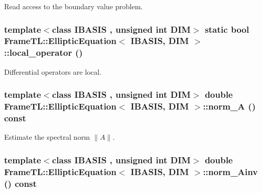 Read access to the boundary value problem. \hypertarget{classFrameTL_1_1EllipticEquation_ca8c08093d2faeac98f8cfae67468f36}{
\subsubsection[{local\_\-operator}]{\setlength{\rightskip}{0pt plus 5cm}template$<$class IBASIS , unsigned int DIM$>$ static bool {\bf FrameTL::EllipticEquation}$<$ IBASIS, DIM $>$::local\_\-operator ()}}
\label{classFrameTL_1_1EllipticEquation_ca8c08093d2faeac98f8cfae67468f36}


Differential operators are local. \hypertarget{classFrameTL_1_1EllipticEquation_49469f7106fa3e7a70791e2da6146df8}{
\subsubsection[{norm\_\-A}]{\setlength{\rightskip}{0pt plus 5cm}template$<$class IBASIS , unsigned int DIM$>$ double {\bf FrameTL::EllipticEquation}$<$ IBASIS, DIM $>$::norm\_\-A () const}}
\label{classFrameTL_1_1EllipticEquation_49469f7106fa3e7a70791e2da6146df8}


Estimate the spectral norm $\|A\|$. \hypertarget{classFrameTL_1_1EllipticEquation_dac74894c3281ab4384e9333792726fc}{
\subsubsection[{norm\_\-Ainv}]{\setlength{\rightskip}{0pt plus 5cm}template$<$class IBASIS , unsigned int DIM$>$ double {\bf FrameTL::EllipticEquation}$<$ IBASIS, DIM $>$::norm\_\-Ainv () const}}
\label{classFrameTL_1_1EllipticEquation_dac74894c3281ab4384e9333792726fc}


